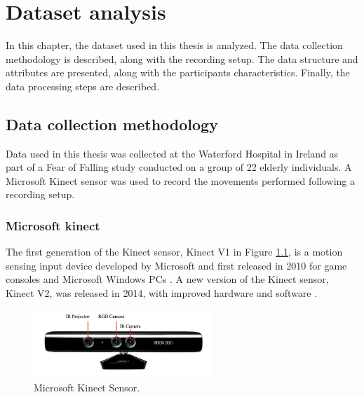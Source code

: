 %
%
\hypersetup{colorlinks=true, linkcolor=blue, citecolor=red}
\chapter{Dataset analysis} \label{chap:dataset_analysis}

    In this chapter, the dataset used in this thesis is analyzed. The data collection methodology is described, along with the recording setup. The data structure and attributes are presented, along with the participants characteristics. Finally, the data processing steps are described.

    \section{Data collection methodology}
        
        Data used in this thesis was collected at the Waterford Hospital in Ireland as part of a Fear of Falling study conducted on a group of 22 elderly individuals.  A Microsoft Kinect sensor was used to record the movements performed following a recording setup. 

        \subsection{Microsoft kinect}

                The first generation of the Kinect sensor, Kinect V1 in Figure \ref{fig:kinect_sensor}, is a motion sensing input device developed by Microsoft and first released in 2010 for game consoles and Microsoft Windows PCs \cite{xu_validity_2015}. A new version of the Kinect sensor, Kinect V2, was released in 2014, with improved hardware and software \cite{cruz_kinect_2012}. 

                \begin{figure}[H]
                    \centering
                    \includegraphics[width=0.6\textwidth]{./resources/kinect/kinect.png}
                    \caption{Microsoft Kinect Sensor.}
                    \label{fig:kinect_sensor}
                \end{figure}

